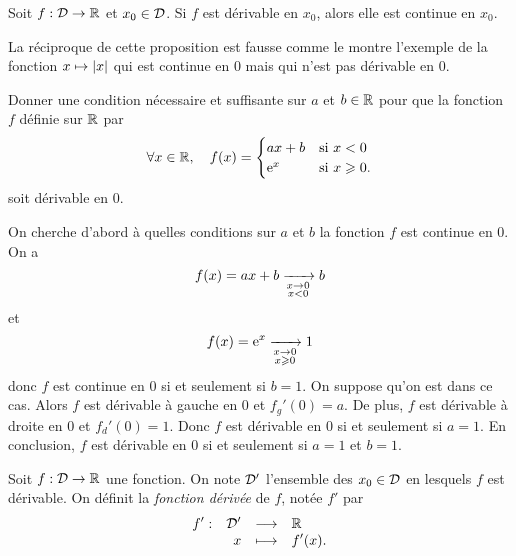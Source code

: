 \documentclass{magnoliaold}
\begin{document}
\begin{proposition}[utile=-3]
Soit $f:\mathcal{D}\to\mathbb{R}$ et $x_0\in\mathcal{D}$. Si $f$ est dérivable en $x_0$,
alors elle est continue en $x_0$.
\end{proposition}

\begin{remarqueUnique}
\remarque La réciproque de cette proposition est fausse comme le montre
  l'exemple de la fonction $x\mapsto\left|x\right|$ qui est continue en 0 mais
  qui n'est pas dérivable en 0.
\end{remarqueUnique}

\begin{exoUnique}
\exo Donner une condition nécessaire et suffisante sur $a$ et $b\in\mathbb{R}$
  pour que la fonction $f$ définie sur $\mathbb{R}$ par
  \[\forall x\in\mathbb{R} ,\quad f(x)=
    \begin{cases}
    ax+b & \text{si $x<0$}\\
    {\rm e}^x & \text{si $x\geqslant 0$}.
    \end{cases}\]
  soit dérivable en 0.
  \begin{sol}
On cherche d'abord à quelles conditions sur $a$ et $b$ la fonction $f$ est continue en 0. On a
\[f(x)=ax+b\xrightarrow[ \substack{x\rightarrow 0 \\ x<0}]{}b\]
et
\[f(x)={\rm e}^x\xrightarrow[ \substack{x\rightarrow 0 \\ x\geqslant 0}]{}1\]
donc $f$ est continue en 0 si et seulement si $b=1$. On suppose qu'on est dans ce cas. Alors $f$ est dérivable à gauche en 0 et $f_g'(0)=a$. De plus, $f$ est dérivable à droite en 0 et $f_d'(0)=1$. Donc $f$ est dérivable en 0 si et seulement si $a=1$. En conclusion, $f$ est dérivable en 0 si et seulement si $a=1$ et $b=1$. 
  \end{sol}
\end{exoUnique}

\begin{definition}[utile=-3]
Soit $f:\mathcal{D}\to\mathbb{R}$ une fonction. On note $\mathcal{D}'$ l'ensemble des $x_0\in\mathcal{D}$ en
lesquels $f$ est dérivable. On définit la \emph{fonction dérivée} de $f$, notée $f'$
par
\[\begin{array}[t]{lrcl} \displaystyle{f'} : & \displaystyle{\mathcal{D}'} & \longrightarrow & \displaystyle{\mathbb{R}} \\ & \displaystyle{x} & \longmapsto & \displaystyle{f'(x).} \end{array}\]
\end{definition}
\end{document}
